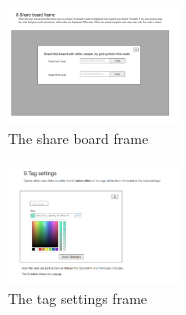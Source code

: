 \begin{figure}[h]
    \includegraphics[width=0.4\textwidth]{content/images/8.ShareBoard.png}
    \caption{The share board frame}
    \label{fig:board-share}
\end{figure}

\begin{figure}[h]
    \includegraphics[width=0.4\textwidth]{content/images/9.TagSettings.png}
    \caption{The tag settings frame}
    \label{fig:tag-settings}
\end{figure}

\newpage











